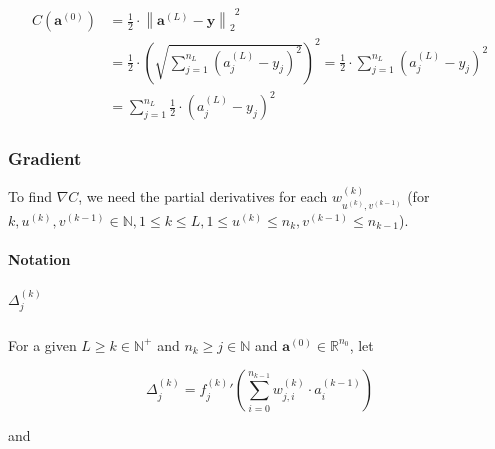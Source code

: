 \documentclass[titlepage]{article}
\begin{document}
      \begin{equation}\label{eqerror}
        \begin{split}
          C \left( \mathbf{a}^{(0)} \right)
              & = \frac{1}{2}
                  \cdot
                  \left\|
                    \mathbf{a}^{(L)} - \mathbf{y}
                  \right\|_2^{\enspace 2} \\
              & = \frac{1}{2}
                  \cdot
                  \left(
                    \sqrt{
                      \sum_{j=1}^{n_L} \left( a_j^{(L)} - y_j \right)^2
                    }
                  \right)^2
                = \frac{1}{2}
                  \cdot
                  \sum_{j=1}^{n_L} \left( a_j^{(L)} - y_j \right)^2 \\
              & = \sum_{j=1}^{n_L}
                    \frac{1}{2} \cdot \left( a_j^{(L)} - y_j \right)^2
        \end{split}
      \end{equation}

      \subsubsection{Gradient}

        To find $\nabla C$, we need the partial derivatives for each
        $w_{u^{(k)},v^{(k-1)}}^{(k)}$
        (for $
          k, u^{(k)}, v^{(k-1)} \in \mathbb{N},
          1 \leq k \leq L,
          1 \leq u^{(k)} \leq n_k,
          v^{(k-1)} \leq n_{k-1}
        $).

        \paragraph{Notation}

          \subparagraph{$\Delta_j^{(k)}$}

            For a given $L \geq k \in \mathbb{N}^+$ and
            $n_k \geq j \in \mathbb{N}$ and
            $\mathbf{a}^{(0)} \in \mathbb{R}^{n_0}$, let

            \begin{equation}
              \Delta_j^{(k)}
                = {f_j^{(k)}}' \left(
                    \sum_{i=0}^{n_{k-1}} w_{j,i}^{(k)} \cdot a_i^{(k-1)}
                  \right)
            \end{equation}

            and
\end{document}
